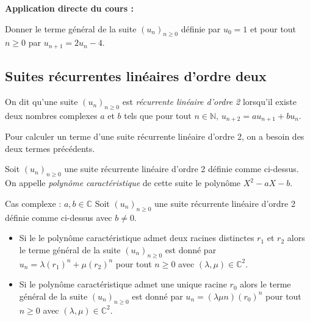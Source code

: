 \documentclass[french,11pt,twoside]{VcCours}
\newenvironment{ApplicationDirecte}{\textbf{Application directe du cours :}

}{}
\begin{document}
\begin{ApplicationDirecte} Donner le terme général de la suite $(u_n)_{n \geq 0}$ définie par $u_0=1$ et pour tout $n \geq 0$ par $u_{n+1} =  2u_n - 4$. \end{ApplicationDirecte}

\subsection{Suites récurrentes linéaires d'ordre deux}

\begin{Definition}{}
On dit qu'une suite $(u_n)_{n \geq 0}$ est \emph{récurrente linéaire d'ordre 2} lorsqu'il existe deux nombres complexes $a$ et $b$ tels que pour tout $n \in \mathbb{N}, \, u_{n+2} = a u_{n+1}+b u_n$.
\end{Definition}

\begin{Remarque}{} Pour calculer un terme d'une suite récurrente linéaire d'ordre 2, on a besoin des deux termes précédents. 
\end{Remarque} 

\begin{Definition}{}
Soit $(u_n)_{n \geq 0}$ une suite récurrente linéaire d'ordre 2 définie comme ci-dessus.\\
On appelle \emph{polynôme caractéristique} de cette suite le polynôme $X^2-aX-b$.
\end{Definition}

\begin{Theoreme}{Cas complexe : $a,b \in \mathbb{C}$}
Soit $(u_n)_{n \geq 0}$ une suite récurrente linéaire d'ordre 2 définie comme ci-dessus avec $b \neq 0.$
\begin{itemize}
\item Si le le polynôme caractéristique admet deux racines distinctes $r_1$ et $r_2$ alors le terme général de la suite $(u_n)_{n \geq 0}$ est donné par $u_n=\lambda (r_1)^n+\mu (r_2)^n$ pour tout $n \geq 0$ avec $(\lambda,\mu) \in \mathbb{C}^2$.
\item Si le polynôme caractéristique admet une unique racine $r_0$ alors le terme général de la suite $(u_n)_{n \geq 0}$ est donné par $u_n= (\lambda\mu n)(r_0)^n$ pour tout $n \geq 0$ avec $(\lambda,\mu) \in \mathbb{C}^2$.
\end{itemize}
\end{Theoreme}
\end{document}
